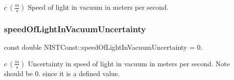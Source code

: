 $c \ (\frac{m}{s})$ Speed of light in vacuum in meters per second. \mbox{\label{group___speed_of_light_gafb67b7afe777d6e23a70ae69e83542d1}} 
\subsubsection{\texorpdfstring{speed\+Of\+Light\+In\+Vacuum\+Uncertainty}{speedOfLightInVacuumUncertainty}}
{\footnotesize\ttfamily const double N\+I\+S\+T\+Const\+::speed\+Of\+Light\+In\+Vacuum\+Uncertainty = 0.}

$c \ (\frac{m}{s})$ Uncertainty in speed of light in vacuum in meters per second. Note should be 0. since it is a defined value. 